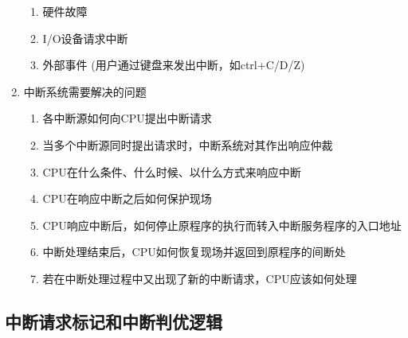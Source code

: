 \documentclass[]{report}
\begin{document}
\begin{enumerate}
\begin{enumerate}
						\item 硬件故障
						\item I/O设备请求中断
						\item 外部事件 (用户通过键盘来发出中断，如ctrl+C/D/Z)
					\end{enumerate}
					\item 中断系统需要解决的问题
					\begin{enumerate}
						\item 各中断源如何向CPU提出中断请求
						\item 当多个中断源同时提出请求时，中断系统对其作出响应仲裁
						\item CPU在什么条件、什么时候、以什么方式来响应中断
						\item CPU在响应中断之后如何保护现场
						\item CPU响应中断后，如何停止原程序的执行而转入中断服务程序的入口地址
						\item 中断处理结束后，CPU如何恢复现场并返回到原程序的间断处
						\item 若在中断处理过程中又出现了新的中断请求，CPU应该如何处理
					\end{enumerate}
				\end{enumerate}
			\subsection{中断请求标记和中断判优逻辑}
\end{document}
